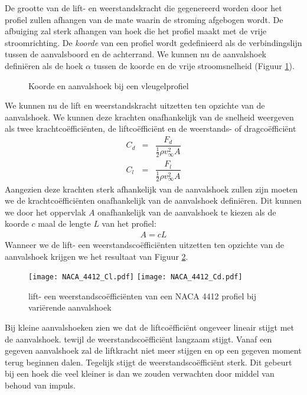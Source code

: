 De grootte van de lift- en weerstandskracht die gegenereerd worden door het profiel zullen afhangen van de mate waarin de stroming afgebogen wordt. De afbuiging zal sterk afhangen van hoek die het profiel maakt met de vrije stroomrichting.
De \emph{koorde} van een profiel wordt gedefinieerd als de verbindingslijn tussen de aanvalsboord en de achterrand. We kunnen nu de aanvalshoek definiëren als de hoek $\alpha$ tussen de koorde en de vrije stroomsnelheid (Figuur \ref{fig:vleugelprofiel aanvalshoek}).
\begin{figure}[htb]
	\centering
	
	\caption{Koorde en aanvalshoek bij een vleugelprofiel}
	\label{fig:vleugelprofiel aanvalshoek}
\end{figure}
We kunnen nu de lift en weerstandskracht uitzetten ten opzichte van de aanvalshoek. We kunnen deze krachten onafhankelijk van de snelheid weergeven als twee krachtcoëfficiënten, de liftcoëfficiënt en de weerstands- of dragcoëfficiënt
\begin{eqnarray}
	C_d &=& \dfrac{F_d}{\frac{1}{2}\rho v_{\infty}^2 A} \\
	C_l &=& \dfrac{F_l}{\frac{1}{2}\rho v_{\infty}^2 A}
\end{eqnarray}
Aangezien deze krachten sterk afhankelijk van de aanvalshoek zullen zijn moeten we de krachtcoëfficiënten onafhankelijk van de aanvalshoek definiëren. Dit kunnen we door het oppervlak $A$ onafhankelijk van de aanvalshoek te kiezen als de koorde $c$ maal de lengte $L$ van het profiel:
\begin{eqnarray}
	A = c L
\end{eqnarray}
Wanneer we de lift- een weerstandscoëfficiënten uitzetten ten opzichte van de aanvalshoek krijgen we het resultaat van Figuur \ref{fig:lift en weerstand ifv aanvalshoek}.
\begin{figure}[htb]
	\centering
	\texttt{[image: NACA\_4412\_Cl.pdf]}
	\texttt{[image: NACA\_4412\_Cd.pdf]}
	\caption{lift- een weerstandscoëfficiënten van een NACA 4412 profiel bij variërende aanvalshoek}
	\label{fig:lift en weerstand ifv aanvalshoek}
\end{figure}

Bij kleine aanvalshoeken zien we dat de liftcoëfficiënt ongeveer lineair stijgt met de aanvalshoek. tewijl de weerstandscoëfficiënt langzaam stijgt. Vanaf een gegeven aanvalshoek zal de liftkracht niet meer stijgen en op een gegeven moment terug beginnen dalen. Tegelijk stijgt de weerstandscoëfficiënt sterk. Dit gebeurt bij een hoek die veel kleiner is dan we zouden verwachten door middel van behoud van impuls.

